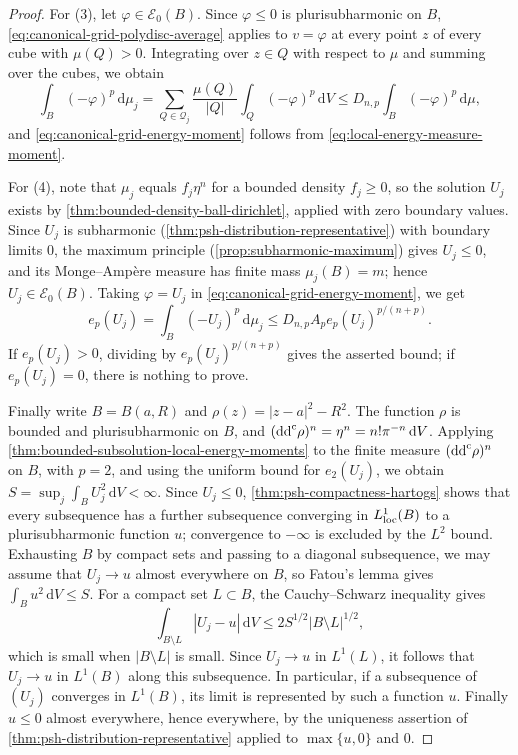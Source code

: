 \begin{proof}
For (3), let $\varphi\in\mathcal E_0(B)$. Since $\varphi\le0$ is plurisubharmonic on $B$, \eqref{eq:canonical-grid-polydisc-average} applies to $v=\varphi$ at every point $z$ of every cube with $\mu(Q)>0$. Integrating over $z\in Q$ with respect to $\mu$ and summing over the cubes, we obtain
\[
 \int_B(-\varphi)^p\,\mathrm d\mu_j
 =\sum_{Q\in\mathcal Q_j}\frac{\mu(Q)}{|Q|}\int_Q(-\varphi)^p\,\mathrm dV
                  \leq D_{n,p}\int_B(-\varphi)^p\,\mathrm d\mu,
\]
and \eqref{eq:canonical-grid-energy-moment} follows from \eqref{eq:local-energy-measure-moment}.

For (4), note that $\mu_j$ equals $f_j\eta^n$ for a bounded density $f_j\ge0$, so the solution $U_j$ exists by \cref{thm:bounded-density-ball-dirichlet}, applied with zero boundary values. Since $U_j$ is subharmonic (\cref{thm:psh-distribution-representative}) with boundary limits $0$, the maximum principle (\cref{prop:subharmonic-maximum}) gives $U_j\le0$, and its Monge--Amp\`ere measure has finite mass $\mu_j(B)=m$; hence $U_j\in\mathcal E_0(B)$. Taking $\varphi=U_j$ in \eqref{eq:canonical-grid-energy-moment}, we get
\[
 e_p(U_j)=\int_B(-U_j)^p\,\mathrm d\mu_j\le D_{n,p}A_pe_p(U_j)^{p/(n+p)}.
\]
If $e_p(U_j)>0$, dividing by $e_p(U_j)^{p/(n+p)}$ gives the asserted bound; if $e_p(U_j)=0$, there is nothing to prove.

Finally write $B=B(a,R)$ and $\rho(z)=|z-a|^2-R^2$. The function $\rho$ is bounded and plurisubharmonic on $B$, and $(\mathrm{dd}^{\mathrm{c}}\rho)^n=\eta^n=n!\pi^{-n}\,\mathrm dV$. Applying \cref{thm:bounded-subsolution-local-energy-moments} to the finite measure $(\mathrm{dd}^{\mathrm{c}}\rho)^n$ on $B$, with $p=2$, and using the uniform bound for $e_2(U_j)$, we obtain $S=\sup_j\int_BU_j^2\,\mathrm dV<\infty$. Since $U_j\le0$, \cref{thm:psh-compactness-hartogs} shows that every subsequence has a further subsequence converging in $L^1_{\mathrm{loc}}(B)$ to a plurisubharmonic function $u$; convergence to $-\infty$ is excluded by the $L^2$ bound. Exhausting $B$ by compact sets and passing to a diagonal subsequence, we may assume that $U_j\to u$ almost everywhere on $B$, so Fatou's lemma gives $\int_Bu^2\,\mathrm dV\le S$. For a compact set $L\subset B$, the Cauchy--Schwarz inequality gives
\[
 \int_{B\setminus L}|U_j-u|\,\mathrm dV\le2S^{1/2}|B\setminus L|^{1/2},
\]
which is small when $|B\setminus L|$ is small. Since $U_j\to u$ in $L^1(L)$, it follows that $U_j\to u$ in $L^1(B)$ along this subsequence. In particular, if a subsequence of $(U_j)$ converges in $L^1(B)$, its limit is represented by such a function $u$. Finally $u\le0$ almost everywhere, hence everywhere, by the uniqueness assertion of \cref{thm:psh-distribution-representative} applied to $\max\{u,0\}$ and $0$.
\end{proof}
